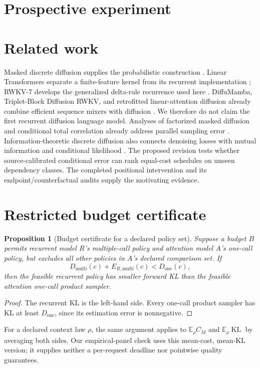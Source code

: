 \documentclass{article}
\newtheorem{proposition}{Proposition}
\newcommand{\KL}{\operatorname{KL}}
\begin{document}
\section{Prospective experiment}


\section{Related work}
Masked discrete diffusion supplies the probabilistic construction
\citep{d3pm,mdlm}. Linear Transformers separate a finite-feature kernel from its
recurrent implementation \citep{lineartransformer}; RWKV-7 develops the
generalized delta-rule recurrence used here \citep{rwkv7}. DiffuMamba,
Triplet-Block Diffusion RWKV, and retrofitted linear-attention diffusion already
combine efficient sequence mixers with diffusion
\citep{diffumamba,triplet,retrofit}. We therefore do not claim the first recurrent
diffusion language model. Analyses of factorized masked diffusion and
conditional total correlation already address parallel sampling error
\citep{factorization2025,ctcdepth2026,intrinsicdependence2026}.
Information-theoretic discrete diffusion also connects denoising losses with
mutual information and conditional likelihood \citep{infodiscrete2025}.
The proposed revision tests whether source-calibrated conditional error can
rank equal-cost schedules on unseen dependency classes. The completed positional
intervention and its endpoint/counterfactual audits supply the motivating evidence.
{\small}
\clearpage
\appendix
\section{Restricted budget certificate}\label{app:budget-certificate}
\begin{proposition}[Budget certificate for a declared policy set]
Suppose a budget $B$ permits recurrent model $R$'s multiple-call policy and
attention model $A$'s one-call policy, but excludes all other policies in $A$'s
declared comparison set. If
\begin{equation}
 D_{\mathrm{multi}}(c)+E_{R,\mathrm{multi}}(c)<D_{\mathrm{one}}(c),
 \label{eq:certificate}
\end{equation}
then the feasible recurrent policy has smaller forward KL than the feasible
attention one-call product sampler.
\end{proposition}
\begin{proof}
The recurrent KL is the left-hand side. Every one-call product sampler has KL
at least $D_{\mathrm{one}}$, since its estimation error is nonnegative.
\end{proof}
For a declared context law $\rho$, the same argument applies to
$\mathbb E_\rho C_M$ and $\mathbb E_\rho\KL$ by averaging both sides.
Our empirical-panel check uses this mean-cost, mean-KL version; it supplies
neither a per-request deadline nor pointwise quality guarantees.
\end{document}
